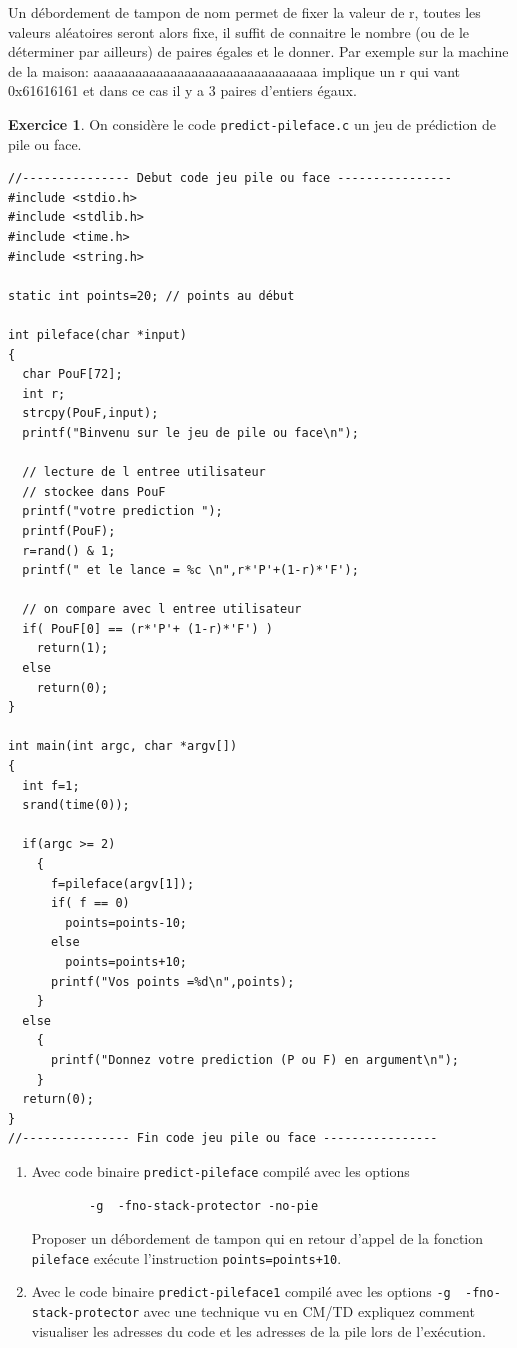 \documentclass[a4paper,9pt]{article}
\theoremstyle{plain}
\theoremstyle{definition}
\newtheorem{exercice}{Exercice}
\newenvironment{terminal}{\color{black}\begin{snugshade*}}
{\end{snugshade*}\color{black}}
\begin{document}
\begin{correction}
  Un débordement de tampon de nom permet de fixer la valeur de r, toutes les valeurs aléatoires seront alors fixe, il suffit de connaitre le nombre (ou de le déterminer par ailleurs) de paires égales et le donner.
  Par exemple sur la machine de la maison: aaaaaaaaaaaaaaaaaaaaaaaaaaaaaaaa implique un r qui vant 0x61616161 et dans ce cas il y a 3 paires d'entiers égaux. 
\end{correction}


\bigskip

\begin{exercice}
  On considère le code \verb|predict-pileface.c|  un jeu de prédiction de pile ou face.
\begin{terminal}
\begin{verbatim}
//--------------- Debut code jeu pile ou face ----------------
#include <stdio.h>
#include <stdlib.h>
#include <time.h>
#include <string.h>

static int points=20; // points au début

int pileface(char *input)
{
  char PouF[72];
  int r;
  strcpy(PouF,input);
  printf("Binvenu sur le jeu de pile ou face\n");            
      
  // lecture de l entree utilisateur
  // stockee dans PouF
  printf("votre prediction ");
  printf(PouF);
  r=rand() & 1;
  printf(" et le lance = %c \n",r*'P'+(1-r)*'F');

  // on compare avec l entree utilisateur
  if( PouF[0] == (r*'P'+ (1-r)*'F') )
    return(1);
  else
    return(0);
}

int main(int argc, char *argv[])
{
  int f=1;
  srand(time(0));

  if(argc >= 2)
    {  
      f=pileface(argv[1]);           
      if( f == 0)
        points=points-10;	     
      else
        points=points+10;
      printf("Vos points =%d\n",points);
    }
  else
    {
      printf("Donnez votre prediction (P ou F) en argument\n");
    }
  return(0);
}
//--------------- Fin code jeu pile ou face ----------------
\end{verbatim}
\end{terminal}

%

\begin{enumerate}
\item Avec code binaire \verb|predict-pileface|  compilé avec les options 
\begin{verbatim}
        -g  -fno-stack-protector -no-pie 
\end{verbatim}
  Proposer un débordement de tampon qui en retour d'appel de la fonction \verb|pileface| exécute l'instruction \verb|points=points+10|.
\item Avec le code binaire \verb|predict-pileface1| compilé avec les options   \verb|-g  -fno-stack-protector| avec une technique vu en CM/TD expliquez comment visualiser les adresses du code et les adresses de la pile lors de l'exécution.  
\end{enumerate}
\end{exercice}
\end{document}
